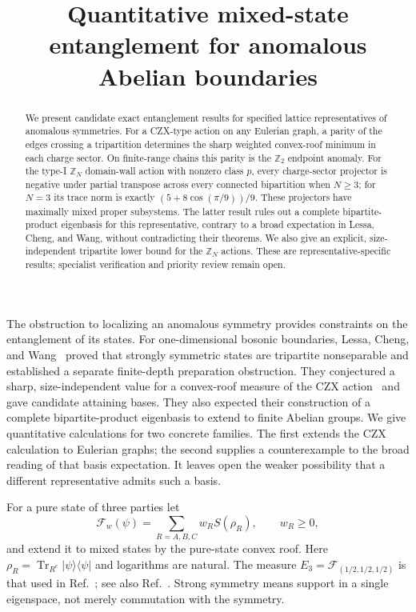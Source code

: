\documentclass[aps,prl,reprint,nofootinbib]{revtex4-2}
\newcommand{\Tr}{\operatorname{Tr}}
\newcommand{\F}{\mathcal F}
\begin{document}
\title{Quantitative mixed-state entanglement for anomalous Abelian boundaries}
\begin{abstract}
We present candidate exact entanglement results for specified lattice
representatives of anomalous symmetries. For a CZX-type action on any
Eulerian graph, a parity of the edges crossing a tripartition determines
the sharp weighted convex-roof minimum in each charge sector. On
finite-range chains this parity is the $\mathbb Z_2$ endpoint anomaly.
For the type-I $\mathbb Z_N$ domain-wall action with nonzero class $p$,
every charge-sector projector is negative under partial transpose across
every connected bipartition when $N\ge3$; for $N=3$ its trace norm is exactly
$(5+8\cos(\pi/9))/9$. These projectors have maximally mixed proper
subsystems. The latter result rules out a complete bipartite-product
eigenbasis for this representative, contrary to a broad expectation in
Lessa, Cheng, and Wang, without contradicting their theorems. We also
give an explicit, size-independent tripartite lower bound for the
$\mathbb Z_N$ actions. These are representative-specific results;
specialist verification and priority review remain open.
\end{abstract}
\maketitle

The obstruction to localizing an anomalous symmetry provides constraints
on the entanglement of its states. For one-dimensional bosonic boundaries,
Lessa, Cheng, and Wang~\cite{LCW} proved that strongly symmetric states
are tripartite nonseparable and established a separate finite-depth
preparation obstruction. They conjectured a sharp, size-independent value
for a convex-roof measure of the CZX action~\cite{Chen} and gave candidate attaining
bases. They also expected their construction of a complete
bipartite-product eigenbasis to extend to finite Abelian groups. We give
quantitative calculations for two concrete families. The first extends
the CZX calculation to Eulerian graphs; the second supplies a counterexample
to the broad reading of that basis expectation. It leaves open the weaker
possibility that a different representative admits such a basis.

For a pure state of three parties let
\begin{equation}
 \F_w(\psi)=\sum_{R=A,B,C}w_RS(\rho_R),\qquad w_R\ge0,
 \label{defF}
\end{equation}
and extend it to mixed states by the pure-state convex roof. Here
$\rho_R=\Tr_{R^c}|\psi\rangle\langle\psi|$ and logarithms are natural.
The measure $E_3=\F_{(1/2,1/2,1/2)}$ is that used in Ref.~\cite{LCW};
see also Ref.~\cite{Szalay}. Strong symmetry means support in a single
eigenspace, not merely commutation with the symmetry.
\end{document}
